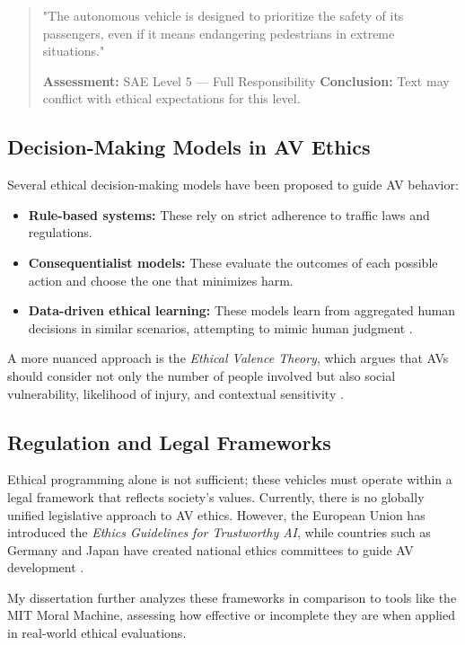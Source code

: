 \begin{quote}
"The autonomous vehicle is designed to prioritize the safety of its passengers, even if it means endangering pedestrians in extreme situations."

\textbf{Assessment:} SAE Level 5 — Full Responsibility  
\textbf{Conclusion:} Text may conflict with ethical expectations for this level.
\end{quote}

\subsection{Decision-Making Models in AV Ethics}

Several ethical decision-making models have been proposed to guide AV behavior:

\begin{itemize}
    \item \textbf{Rule-based systems:} These rely on strict adherence to traffic laws and regulations.
    \item \textbf{Consequentialist models:} These evaluate the outcomes of each possible action and choose the one that minimizes harm.
    \item \textbf{Data-driven ethical learning:} These models learn from aggregated human decisions in similar scenarios, attempting to mimic human judgment \cite{mcdermid2021ethics}.
\end{itemize}

A more nuanced approach is the \textit{Ethical Valence Theory}, which argues that AVs should consider not only the number of people involved but also social vulnerability, likelihood of injury, and contextual sensitivity \cite{millar2022ethical}.

\subsection{Regulation and Legal Frameworks}

Ethical programming alone is not sufficient; these vehicles must operate within a legal framework that reflects society's values. Currently, there is no globally unified legislative approach to AV ethics. However, the European Union has introduced the \textit{Ethics Guidelines for Trustworthy AI}, while countries such as Germany and Japan have created national ethics committees to guide AV development \cite{ecguidelines2019}.

My dissertation further analyzes these frameworks in comparison to tools like the MIT Moral Machine, assessing how effective or incomplete they are when applied in real-world ethical evaluations.

